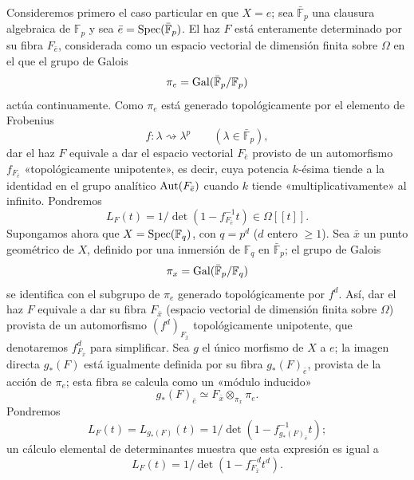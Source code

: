 Consideremos primero el caso particular en que $X=e$; sea $\bar{\mathbb F}_p$ una clausura algebraica de $\mathbb F_p$ y sea $\bar e=\operatorname{Spec}(\bar{\mathbb F}_p)$. El haz $F$ está enteramente determinado por su fibra $F_{\bar e}$, considerada como un espacio vectorial de dimensión finita sobre $\Omega$ en el que el grupo de Galois
\[
\pi_e=\operatorname{Gal}(\bar{\mathbb F}_p/\mathbb F_p)
\]
actúa continuamente. Como $\pi_e$ está generado topológicamente por el elemento de Frobenius
\[
f: \lambda\rightsquigarrow \lambda^p\qquad(\lambda\in\bar{\mathbb F}_p),
\]
dar el haz $F$ equivale a dar el espacio vectorial $F_{\bar e}$ provisto de un automorfismo $f_{F_{\bar e}}$ «topológicamente unipotente», es decir, cuya potencia $k$-ésima tiende a la identidad en el grupo analítico $\operatorname{Aut}(F_{\bar e})$ cuando $k$ tiende «multiplicativamente» al infinito. Pondremos
\[
L_F(t)=1/\det(1-f_{F_{\bar e}}^{-1}t)\in\Omega[[t]].
\]
Supongamos ahora que $X=\operatorname{Spec}(\mathbb F_q)$, con $q=p^d$ ($d$ entero $\ge1$). Sea $\bar x$ un punto geométrico de $X$, definido por una inmersión de $\mathbb F_q$ en $\bar{\mathbb F}_p$; el grupo de Galois
\[
\pi_x=\operatorname{Gal}(\bar{\mathbb F}_p/\mathbb F_q)
\]
se identifica con el subgrupo de $\pi_e$ generado topológicamente por $f^d$. Así, dar el haz $F$ equivale a dar su fibra $F_{\bar x}$ (espacio vectorial de dimensión finita sobre $\Omega$) provista de un automorfismo $(f^d)_{F_{\bar x}}$ topológicamente unipotente, que denotaremos $f^d_{F_{\bar x}}$ para simplificar. Sea $g$ el único morfismo de $X$ a $e$; la imagen directa $g_*(F)$ está igualmente definida por su fibra $g_*(F)_{\bar e}$, provista de la acción de $\pi_e$; esta fibra se calcula como un «módulo inducido»
\[
g_*(F)_{\bar e}\simeq F_{\bar x}\otimes_{\pi_x}\pi_e.
\]
Pondremos
\[
L_F(t)=L_{g_*(F)}(t)=1/\det(1-f^{-1}_{g_*(F)_{\bar e}}t);
\]
un cálculo elemental de determinantes muestra que esta expresión es igual a
\[
L_F(t)=1/\det(1-f^{-d}_{F_{\bar x}}t^d).
\]
